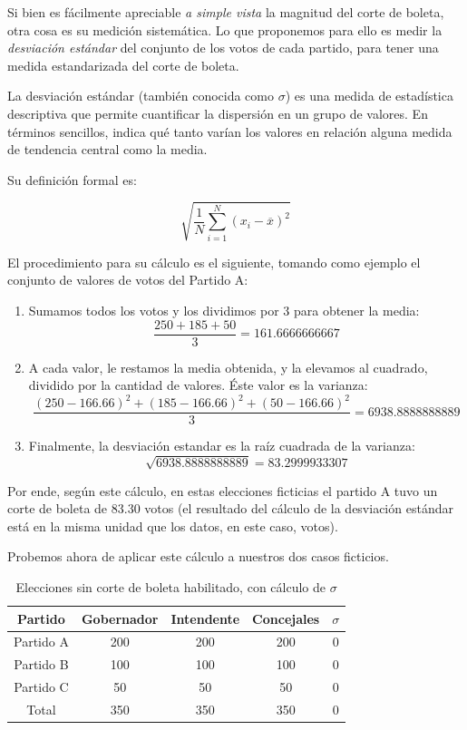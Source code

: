 \documentclass[12pt,a4paper]{article}
\begin{document}
Si bien es fácilmente apreciable \emph{a simple vista} la magnitud del corte de boleta, otra cosa es
su medición sistemática. Lo que proponemos para ello es medir la
\emph{desviación estándar} del conjunto de los votos de cada partido, para tener una medida
estandarizada del corte de boleta.

La desviación estándar (también conocida como \(\sigma\)) es una medida de
estadística descriptiva que permite 
cuantificar la dispersión en un grupo de valores. En términos sencillos, indica
qué tanto varían los valores en relación alguna medida de tendencia central como
la media.

Su definición formal es:

\[ \sqrt{\frac{1}{N} \sum_{i=1}^N (x_i - \overline{x})^2} \]

El procedimiento para su cálculo es el siguiente, tomando como ejemplo el
conjunto de valores de votos del Partido A:

\begin{enumerate}
  \item Sumamos todos los votos y los dividimos por 3 para obtener la media:
\[ \frac{250 + 185 + 50}{3} = 161.6666666667\]
  \item A cada valor, le restamos la media obtenida, y  la elevamos al cuadrado,
    dividido por la cantidad de valores. Éste valor es la varianza:
\[\frac{(250 - 166.66)^2 + (185 - 166.66)^2 + (50-166.66)^2}{3} = 6938.8888888889\]
  \item Finalmente, la desviación estandar es la raíz cuadrada de la varianza:
\[\sqrt{6938.8888888889} = 83.2999933307\]
\end{enumerate}

Por ende, según este cálculo, en estas elecciones ficticias el partido A tuvo un
corte de boleta de 83.30 votos (el resultado del cálculo de la desviación
estándar está en la misma unidad que los datos, en este caso, votos).

Probemos ahora de aplicar este cálculo a nuestros dos casos ficticios.

\renewcommand{\arraystretch}{1.25}
\begin{table}[h!]
\centering
\begin{tabular}{c c c c c} 
 Partido & Gobernador & Intendente & Concejales & \(\sigma\) \\ [0.5ex] 
 \hline
Partido A & 200 & 200 & 200 & 0 \\
Partido B & 100 & 100 & 100 & 0 \\
Partido C & 50 & 50 & 50 & 0 \\
 \hline
Total & 350 & 350 & 350 & 0 \\ [1ex]
 \hline
\end{tabular}
\caption{Elecciones sin corte de boleta habilitado, con cálculo de \(\sigma\)}
\label{table:1}
\end{table}
\end{document}
